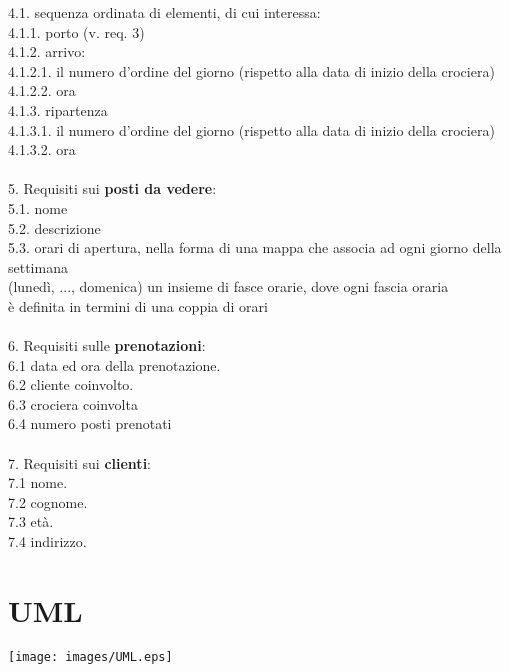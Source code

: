 \documentclass[12pt, letterpaper]{article}
\newcommand{\acc}{\\\hphantom{}\\}
\begin{document}
\hphantom{ident}4.1. sequenza ordinata di elementi, di cui interessa:\\
\hphantom{ident}\hphantom{ident}4.1.1. porto (v. req. 3)\\
\hphantom{ident}\hphantom{ident}4.1.2. arrivo:\\
\hphantom{ident}\hphantom{ident}\hphantom{ident}4.1.2.1. il numero d'ordine del giorno (rispetto alla data di inizio della crociera)\\
\hphantom{ident}\hphantom{ident}\hphantom{ident}4.1.2.2. ora\\
\hphantom{ident}\hphantom{ident}4.1.3. ripartenza	\\
\hphantom{ident}\hphantom{ident}\hphantom{ident}4.1.3.1. il numero d'ordine del giorno (rispetto alla data di inizio della crociera)\\
\hphantom{ident}\hphantom{ident}\hphantom{ident}4.1.3.2. ora
\acc
5. Requisiti sui \textbf{posti da vedere}:\\
\hphantom{ident}5.1. nome\\
\hphantom{ident}5.2. descrizione\\
\hphantom{ident}5.3. orari di apertura, nella forma di una mappa che associa ad ogni giorno della settimana\\
\hphantom{ident}\hphantom{ident}(lunedì, ..., domenica) un insieme di fasce orarie, dove ogni fascia oraria\\
\hphantom{ident}\hphantom{ident}è definita in termini di una coppia di orari\acc
6. Requisiti sulle \textbf{prenotazioni}:\\
\hphantom{ident}6.1 data ed ora della prenotazione.\\
\hphantom{ident}6.2 cliente coinvolto.\\
\hphantom{ident}6.3 crociera coinvolta\\
\hphantom{ident}6.4 numero posti prenotati\acc
7. Requisiti sui \textbf{clienti}:\\
\hphantom{ident}7.1 nome.\\
\hphantom{ident}7.2 cognome.\\
\hphantom{ident}7.3 età.\\
\hphantom{ident}7.4 indirizzo.
\newpage
\section{UML}\begin{center}

    \texttt{[image: images/UML.eps]}
\end{center}
\newpage
\end{document}
